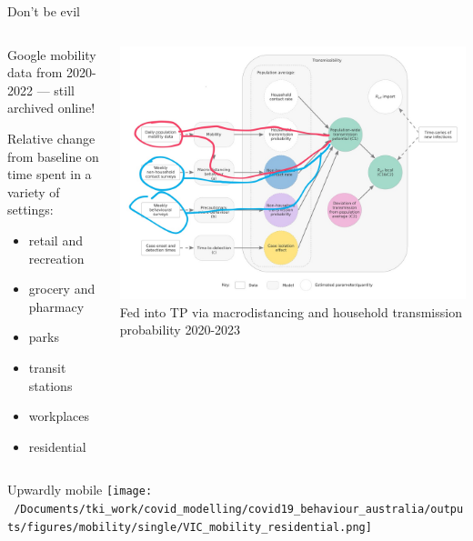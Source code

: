 \documentclass[
  ignorenonframetext,
  aspectratio=149,
]{beamer}
\providecommand{\tightlist}{%
  \setlength{\itemsep}{0pt}\setlength{\parskip}{0pt}}\usepackage{longtable,booktabs,array}
\begin{document}
\begin{frame}{Don't be evil}
\label{dont-be-evil-1}
\begin{columns}[T]
\begin{column}{0.6\textwidth}
Google mobility data from 2020-2022 --- still archived online!\newline

Relative change from baseline on time spent in a variety of
settings:\newline

\begin{itemize}
\tightlist
\item
  retail and recreation
\item
  grocery and pharmacy
\item
  parks
\item
  transit stations
\item
  workplaces
\item
  residential\newline
\end{itemize}
\end{column}

\begin{column}{0.4\textwidth}
\includegraphics{images/tp_model_schema_drawn_on.jpg} Fed into TP via
macrodistancing and household transmission probability 2020-2023
\end{column}
\end{columns}
\end{frame}

\begin{frame}{Upwardly mobile}
\label{upwardly-mobile}
\texttt{[image: ~/Documents/tki\_work/covid\_modelling/covid19\_behaviour\_australia/outputs/figures/mobility/single/VIC\_mobility\_residential.png]}
\end{frame}
\end{document}
